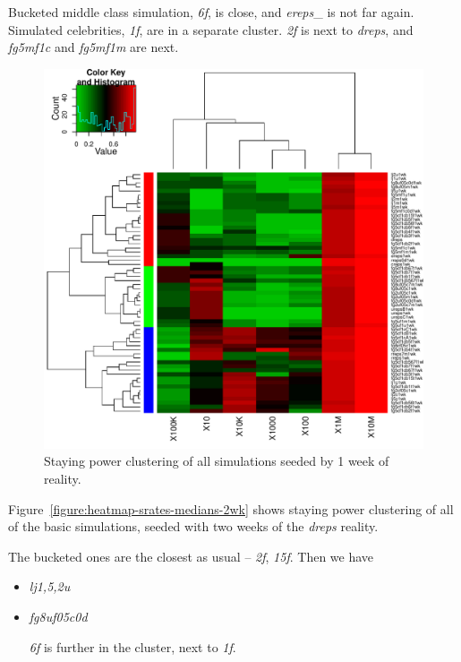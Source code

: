 \documentclass[10pt,oneside]{memoir}
\begin{document}
Bucketed middle class simulation, {\itshape 6f}, is close, and {\itshape ereps}\_ is not far again.  Simulated celebrities, {\itshape 1f}, are in a separate cluster.  {\itshape 2f} is next to {\itshape dreps}, and {\itshape fg5mf1c} and {\itshape fg5mf1m} are next.



\begin{figure}
\begin{center}
    \includegraphics{figures/heatmap-srates-medians-1wk}
    \caption{Staying power clustering of all simulations seeded by 1 week of reality.}
    \label{figure:heatmap-srates-medians-1wk}
\end{center}
\end{figure}
Figure~\ref{figure:heatmap-srates-medians-2wk} shows staying power clustering of all of the basic simulations, seeded with two weeks of the {\itshape dreps} reality.


The bucketed ones are the closest as usual -- {\itshape 2f}, {\itshape 15f}.  Then we have 


\begin{itemize}


\item {\itshape lj{1,5,2}u}

\item {\itshape fg8uf05c0d}


{\itshape 6f} is further in the cluster, next to {\itshape 1f}.



\end{itemize}
\end{document}
